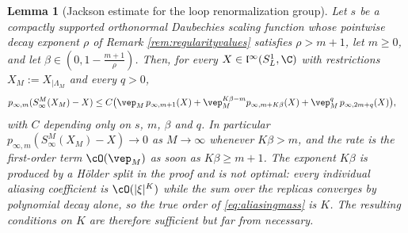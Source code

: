 \documentclass[a4paper, 11pt]{article}
\newcommand{\fl}{\mathfrak{l}}\newcommand{\cl}{\mathcal{l}}
\DeclareMathOperator{\1}{\mathds{1}}
\newtheorem{lemma}[thm]{Lemma}
\begin{document}
\begin{lemma}[Jackson estimate for the loop renormalization group]
\label{lem:loopjackson}
Let $s$ be a compactly supported orthonormal Daubechies scaling function whose pointwise decay exponent $\rho$ of Remark \ref{rem:regularityvalues} satisfies $\rho>m+1$, let $m\geq0$, and let $\beta\in(0,1-\tfrac{m+1}{\rho})$. Then, for every $X\in\fl^{\infty}(S^{1}_{L},\C)$ with restrictions $X_{M}:=X_{|\Lambda_{M}}$ and every $q>0$,
\begin{align}
\label{eq:loopjackson}
p_{\infty,m}(S^{M}_{\infty}(X_{M})-X) & \leq C\big(\vep_{M}\!\ p_{\infty,m+1}(X)+\vep_{M}^{K\beta-m}p_{\infty,m+K\beta}(X)+\vep_{M}^{q}\!\ p_{\infty,2m+q}(X)\big),
\end{align}
with $C$ depending only on $s$, $m$, $\beta$ and $q$. In particular $p_{\infty,m}(S^{M}_{\infty}(X_{M})-X)\rightarrow0$ as $M\rightarrow\infty$ whenever $K\beta>m$, and the rate is the first-order term $\cO(\vep_{M})$ as soon as $K\beta\geq m+1$. The exponent $K\beta$ is produced by a H\"older split in the proof and is not optimal: every individual aliasing coefficient is $\cO(|\xi|^{K})$ while the sum over the replicas converges by polynomial decay alone, so the true order of \eqref{eq:aliasingmass} is $K$. The resulting conditions on $K$ are therefore sufficient but far from necessary.
\end{lemma}
\end{document}
